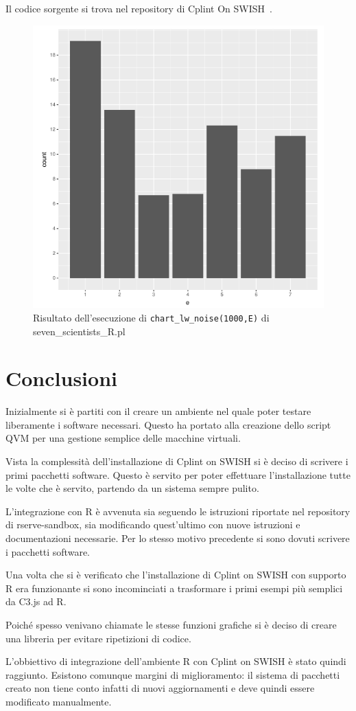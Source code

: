 \documentclass[10pt,titlepage,twoside,a4paper]{report}
\begin{document}
Il codice sorgente si trova nel repository di Cplint On 
SWISH~\cite{sevenScientistsRpl}.

\begin{figure}[H]
\centering
\caption{Risultato dell'esecuzione di \texttt{chart\_lw\_noise(1000,E)} di seven\_scientists\_R.pl}
\label{fig:sevenScientistsRResult}
\includegraphics[width=.5\linewidth]{seven_scientists_R_plot.png}
\end{figure}



\chapter{Conclusioni}
Inizialmente si è partiti con il creare un ambiente nel quale poter testare 
liberamente i software necessari. Questo ha portato alla creazione dello 
script QVM per una gestione semplice delle macchine virtuali.

Vista la complessità dell'installazione di Cplint on SWISH si è 
deciso di scrivere i primi pacchetti software.
Questo è servito per poter effettuare l'installazione tutte le volte che è
servito, partendo da un sistema sempre pulito.

L'integrazione con R è avvenuta sia seguendo le istruzioni riportate nel 
repository di rserve-sandbox, sia modificando quest'ultimo con nuove istruzioni 
e documentazioni necessarie. Per lo stesso motivo precedente si sono dovuti 
scrivere i pacchetti software.

Una volta che si è verificato che l'installazione di Cplint on SWISH con 
supporto R era funzionante si sono incominciati a trasformare i primi esempi 
più semplici da C3.js ad R. 

Poiché spesso venivano chiamate le stesse funzioni grafiche si è deciso di 
creare una libreria per evitare ripetizioni di codice.

L'obbiettivo di integrazione dell'ambiente R con Cplint on SWISH è stato 
quindi raggiunto. Esistono comunque margini di miglioramento: il sistema di 
pacchetti creato non tiene conto infatti di nuovi aggiornamenti e deve quindi
essere modificato manualmente.




\printbibliography
\end{document}
